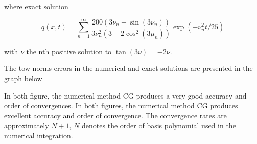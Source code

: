 \documentclass[11pt,a4paper]{article}
\begin{document}
	where exact solution 
	
	$$ q(x,t) = \sum_{n=1}^{\infty}\dfrac{200(3\nu_n-\sin(3\nu_n))}{3\nu_n^2(3+2\cos^2(3\mu_n))}\exp(-\nu_n^2t/25)$$
	
	with $\nu$ the nth positive solution to $\tan(3\nu) = -2\nu.$
	
	The tow-norms errors in the numerical and exact solutions are presented in the graph below
	
	
	\begin{figure}[H]
		
		\centering
		\label{fig:4a}
		\label{fig:4b}
		
		\label{fig:4}
	\end{figure}
	
	In both figure, the numerical method CG produces a very good accuracy and order of convergences. In both figures, the numerical method CG produces excellent accuracy and order of convergence. The convergence rates are approximately $N+1$, $N$ denotes the order of basis polynomial used in the numerical integration.\\
	
\end{document}
